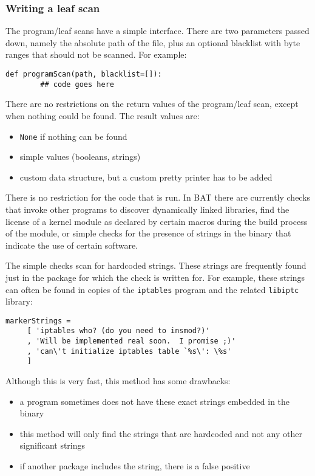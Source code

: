 \documentclass[10pt]{article}
\begin{document}
\subsubsection{Writing a leaf scan}

The program/leaf scans have a simple interface. There are two parameters
passed down, namely the absolute path of the file, plus an optional blacklist
with byte ranges that should not be scanned. For example:

\begin{verbatim}
def programScan(path, blacklist=[]):
        ## code goes here
\end{verbatim}

There are no restrictions on the return values of the program/leaf scan, except
when nothing could be found. The result values are:

\begin{itemize}
\item \texttt{None} if nothing can be found
\item simple values (booleans, strings)
\item custom data structure, but a custom pretty printer has to be added
\end{itemize}

There is no restriction for the code that is run. In BAT there are currently
checks that invoke other programs to discover dynamically linked libraries,
find the license of a kernel module as declared by certain macros during the
build process of the module, or simple checks for the presence of strings in
the binary that indicate the use of certain software.

The simple checks scan for hardcoded strings. These strings are frequently
found just in the package for which the check is written for. For example,
these strings can often be found in copies of the \texttt{iptables} program and
the related \texttt{libiptc} library:

\begin{verbatim}
markerStrings =
     [ 'iptables who? (do you need to insmod?)'
     , 'Will be implemented real soon.  I promise ;)'
     , 'can\'t initialize iptables table `%s\': \%s'
     ]
\end{verbatim}

Although this is very fast, this method has some drawbacks:

\begin{itemize}
\item a program sometimes does not have these exact strings embedded in the
binary
\item this method will only find the strings that are hardcoded and not any
other significant strings
\item if another package includes the string, there is a false positive
\end{itemize}
\end{document}
